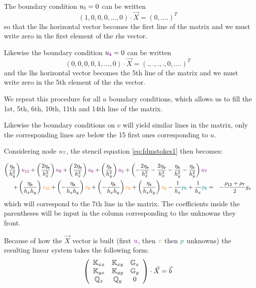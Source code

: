 The boundary condition $u_{\color{violet} \tt 0}=0$ can be written 
\[
(1,0,0,0,...,0) \cdot \vec{X} = (0,....)^T
\]
so that the lhs horizontal vector becomes the first line of the matrix and we
must write zero in the first element of the rhs vector. 

Likewise the boundary condition $u_{\color{violet} \tt 4}=0$ can be written
\[
(0,0,0,0,1,...,0) \cdot \vec{X} = (.,.,.,.,0,....)^T
\]
and the lhs horizontal vector becomes the 5th line of the matrix and we
must write zero in the 5th element of the rhs vector. 

We repeat this procedure for all $u$ boundary conditions, which allows us to fill 
the 1st, 5th, 6th, 10th, 11th and 14th line of the matrix.

Likewise the boundary conditions on $v$ will yield similar lines in the matrix, 
only the corresponding lines are below the 15 first ones corresponding to $u$.

Considering node ${\color{violet} u_7}$, the stencil equation \eqref{eq:fdmstokes1} then becomes:



\begin{eqnarray}
\left( \frac{\eta_{\tt n}}{h_y^2} \right) {\color{violet} u_{\tt 12}} + 
\left( \frac{2\eta_{\tt e}}{h_x^2} \right) {\color{violet} u_{\tt 8}} + 
\left( \frac{2\eta_{\tt w}}{h_x^2} \right) {\color{violet} u_{\tt 6}} + 
\left( \frac{\eta_{\tt s}}{h_y^2} \right) {\color{violet} u_{\tt 2}} + 
\left( -\frac{2\eta_{\tt e}}{h_x^2} -\frac{2\eta_{\tt w}}{h_x^2}  
-\frac{\eta_{\tt n}}{h_y^2} -\frac{\eta_{\tt s}}{h_y^2}  
\right) {\color{violet} u_7} \nonumber\\
+
\left( \frac{\eta_{\tt n}}{h_x h_y} \right) {\color{orange} v_{\tt 10}}+ 
\left(-\frac{\eta_{\tt n}}{h_x h_y} \right) {\color{orange} v_{\tt 9}}+ 
\left(-\frac{\eta_{\tt s}}{h_x h_y} \right) {\color{orange} v_{\tt 6}}+ 
\left( \frac{\eta_{\tt s}}{h_x h_y} \right) {\color{orange} v_{\tt 5}} 
- \frac{1}{h_x} {\color{teal}p_{\tt 6}} + \frac{1}{h_x} {\color{teal}p_{\tt 5}} 
&=& -\frac{\rho_{\tt 12}+\rho_{\tt 7}}{2} g_x \nonumber
\end{eqnarray}
which will correspond to the 7th line in the matrix. The coefficients inside the 
parentheses will be input in the column corresponding to the unknowns they front. 



Because of how the $\vec{X}$ vector is built (first ${\color{violet} u}$, 
then ${\color{orange}v}$ then ${\color{teal} p}$ unknowns)
the resulting linear system takes the following form:
\begin{equation}
\left(
\begin{array}{ccc}
{\mathbb{K}}_{xx} & {\mathbb{K}}_{xy} & {\mathbb{G}}_x \\
{\mathbb{K}}_{yx} & {\mathbb{K}}_{yy} & {\mathbb{G}}_y \\
{\mathbb{Q}}_x & {\mathbb{Q}}_y & 0
\end{array}
\right)
\cdot
\vec{X}
=\vec{b}
\label{eq:fdmstokes6}
\end{equation}











